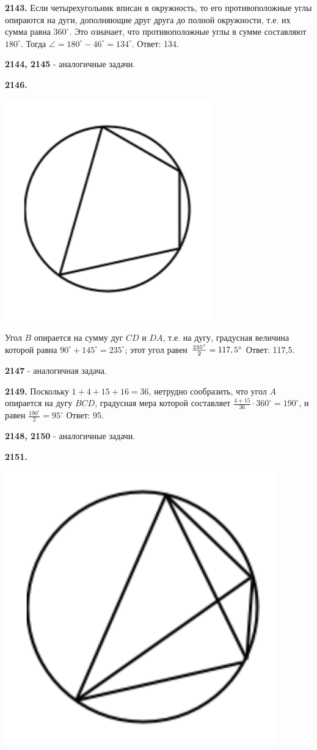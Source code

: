 \textbf{2143.} Если четырехугольник вписан в окружность, то его противоположные углы опираются на дуги, дополняющие друг друга до полной окружности, т.е. их сумма равна $360^\circ$. Это означает, что противоположные углы в сумме составляют $180^\circ$. Тогда $\angle = 180^\circ - 46^\circ=134^\circ$. \newline \null \hspace*{\fill} Ответ: 134.

\textbf{2144, 2145} - аналогичные задачи.

\textbf{2146.}

{\centering \includegraphics[width=0.35\linewidth]{Geometry/Content/43.png}
	
}

Угол $B$ опирается на сумму дуг $CD$ и $DA$, т.е. на дугу, градусная величина которой равна $90^\circ+145^\circ=235^\circ$; этот угол равен $\linebreak \frac{235^\circ}{2}=117,5^\circ$ \newline \null \hspace*{\fill} Ответ: 117,5.

\textbf{2147} - аналогичная задача.

\textbf{2149.}  Поскольку $1+4+15+16=36$, нетрудно сообразить, что угол $A$ опирается на дугу $BCD$, градусная мера которой составляет $\frac{4+15}{36}\cdot360^\circ=190^\circ$, и равен $\frac{190^\circ}{2}=95^\circ$ \newline \null \hspace*{\fill} Ответ: 95.

\textbf{2148, 2150} - аналогичные задачи.

\textbf{2151.}

{\centering \includegraphics[width=0.35\linewidth]{Geometry/Content/44.png}
	
}

